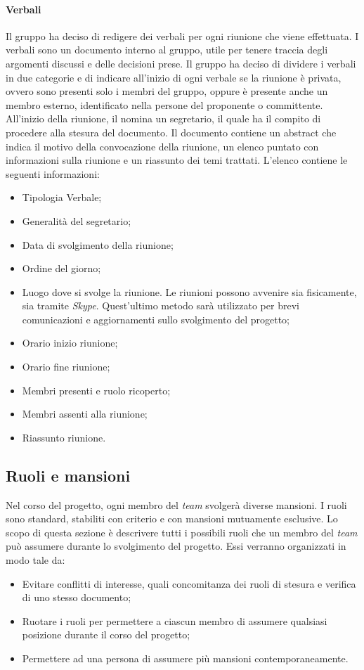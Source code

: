 			\paragraph{Verbali}
			Il gruppo ha deciso di redigere dei verbali per ogni riunione che viene effettuata. I verbali sono un documento interno al gruppo, utile per tenere traccia degli argomenti discussi e delle decisioni prese. Il gruppo ha deciso di dividere i verbali in due categorie e di indicare all'inizio di ogni verbale se la riunione è privata, ovvero sono presenti solo i membri del gruppo, oppure è presente anche un membro esterno, identificato nella persone del proponente o committente. All'inizio della riunione, il \textit{\RdP} nomina un segretario, il quale ha il compito di procedere alla stesura del documento. Il documento contiene un abstract che indica il motivo della convocazione della riunione, un elenco puntato con informazioni sulla riunione e un riassunto dei temi trattati. L'elenco contiene le seguenti informazioni:
			\begin{itemize}
				\item Tipologia Verbale;
				\item Generalità del segretario;
				\item Data di svolgimento della riunione;
				\item Ordine del giorno;
				\item Luogo dove si svolge la riunione. Le riunioni possono avvenire sia fisicamente, sia tramite \textit{Skype}. Quest'ultimo metodo sarà utilizzato per brevi comunicazioni e aggiornamenti sullo svolgimento del progetto;
				\item Orario inizio riunione;
				\item Orario fine riunione;
				\item Membri presenti e ruolo ricoperto;
				\item Membri assenti alla riunione;
				\item Riassunto riunione.
			\end{itemize}

	\subsection{Ruoli e mansioni}
	Nel corso del progetto, ogni membro del \textit{team} svolgerà diverse mansioni. I ruoli sono standard, stabiliti con criterio e con mansioni mutuamente esclusive. Lo scopo di questa sezione è descrivere tutti i possibili ruoli che un membro del \textit{team} può assumere durante lo svolgimento del progetto. Essi verranno organizzati in modo tale da:
	\begin{itemize}
		\item Evitare conflitti di interesse, quali concomitanza dei ruoli di stesura e verifica di uno stesso documento;
		\item Ruotare i ruoli per permettere a ciascun membro di assumere qualsiasi posizione durante il corso del progetto;
		\item Permettere ad una persona di assumere più mansioni contemporaneamente.
	\end{itemize}

